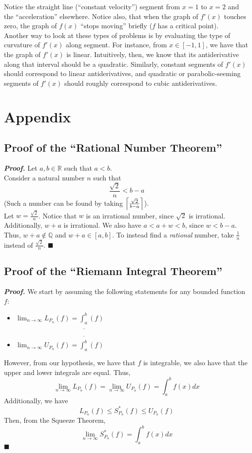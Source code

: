 \documentclass[10pt]{article}
\def\Q{{\mathbb Q}}
\def\R{{\mathbb R}}
\DeclarePairedDelimiter\ceil{\lceil}{\rceil}
\newcommand{\emptyline}[0]{\\\hfill$~$\\}
\newenvironment{proof}{\par\textit{\textbf{Proof.}}}{\hfill$\blacksquare$}
\begin{document}
Notice the straight line (``constant velocity'') segment from $x=1$ to $x=2$ and the ``acceleration'' elsewhere. Notice also, that when the graph of $f'(x)$ touches zero, the graph of $f(x)$ ``stops moving'' briefly ($f$ has a critical point).
\emptyline
Another way to look at these types of problems is by evaluating the type of curvature of $f'(x)$ along segment. For instance, from $x\in[-1,1]$, we have that the graph of $f'(x)$ is linear. Intuitively, then, we know that its antiderivative along that interval should be a quadratic. Similarly, constant segments of $f'(x)$ should correspond to linear antiderivatives, and quadratic or parabolic-seeming segments of $f'(x)$ should roughly correspond to cubic antiderivatives.
\section{Appendix}
\subsection{Proof of the ``Rational Number Theorem''}
\begin{proof}
    Let $a,b\in\R$ such that $a<b$. \\
    Consider a natural number $n$ such that
    $$
        \frac{\sqrt 2}{n}<b-a
    $$
    (Such a number can be found by taking $\ceil*{\frac{\sqrt 2}{b-a}}$). \\
    Let $w=\frac{\sqrt{2}}{n}$. Notice that $w$ is an irrational number, since $\sqrt{2}$ is irrational. Additionally, $w+a$ is irrational. We also have $a<a+w<b$, since $w<b-a$. Thus, $w+a\notin\Q$ and $w+a\in[a,b]$. To instead find a \textit{rational} number, take $\frac{1}{n}$ instead of $\frac{\sqrt{2}}{n}$.
\end{proof}
\subsection{Proof of the ``Riemann Integral Theorem''}
\begin{proof}
    We start by assuming the following statements for any bounded function $f$:
    \begin{itemize}
        \item $\displaystyle\lim_{n\to\infty}L_{P_n}(f)=\underline{\int_a^b}(f)$
        \item $\displaystyle\lim_{n\to\infty}U_{P_n}(f)=\overline{\int_a^b}(f)$
    \end{itemize}
    However, from our hypothesis, we have that $f$ is integrable, we also have that the upper and lower integrals are equal. Thus,
    $$
        \lim_{n\to\infty} L_{P_n}(f)=\lim_{n\to\infty} U_{P_n}(f) = \int_a^b f(x)dx
    $$
    Additionally, we have
    $$
        L_{P_n}(f)\leq S_{P_n}^*(f)\leq U_{P_n}(f)
    $$
    Then, from the Squeeze Theorem,
    $$
        \lim_{n\to\infty} S_{P_n}^*(f)=\int_a^bf(x)dx
    $$
\end{proof}
\end{document}
